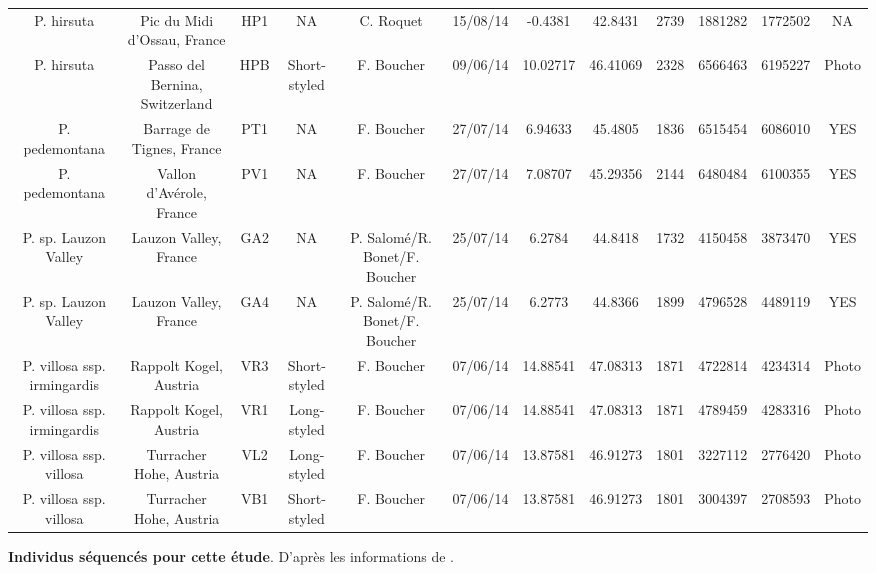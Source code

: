 \documentclass[12pt,a4paper,notitlepage,colorinlistoftodos]{article}
\begin{document}
\begin{landscape}
\begin{annexe}
{\begin{tabular}{cccccccccccc}
P. hirsuta &Pic du Midi d'Ossau, France &HP1 & NA &C. Roquet &15/08/14 & -0.4381 & 42.8431 &2739&1881282&1772502& NA \\
P. hirsuta &Passo del Bernina, Switzerland &HPB &Short-styled &F. Boucher &09/06/14 & 10.02717 & 46.41069 &2328&6566463&6195227&Photo \\
P. pedemontana &Barrage de Tignes, France &PT1 & NA &F. Boucher &27/07/14 & 6.94633 & 45.4805 &1836&6515454&6086010&YES \\
P. pedemontana &Vallon d'Avérole, France &PV1 & NA &F. Boucher &27/07/14 & 7.08707 & 45.29356 &2144&6480484&6100355&YES \\
P. sp. Lauzon Valley &Lauzon Valley, France &GA2 & NA &P. Salomé/R. Bonet/F. Boucher &25/07/14 & 6.2784 & 44.8418 &1732&4150458&3873470&YES \\
P. sp. Lauzon Valley &Lauzon Valley, France &GA4 & NA &P. Salomé/R. Bonet/F. Boucher &25/07/14 & 6.2773 & 44.8366 &1899&4796528&4489119&YES \\
P. villosa ssp. irmingardis &Rappolt Kogel, Austria &VR3 &Short-styled &F. Boucher &07/06/14 & 14.88541 & 47.08313 &1871&4722814&4234314&Photo \\
P. villosa ssp. irmingardis &Rappolt Kogel, Austria &VR1 &Long-styled &F. Boucher &07/06/14 & 14.88541 & 47.08313 &1871&4789459&4283316&Photo \\
P. villosa ssp. villosa &Turracher Hohe, Austria &VL2 &Long-styled &F. Boucher &07/06/14 & 13.87581 & 46.91273 &1801&3227112&2776420&Photo \\
P. villosa ssp. villosa &Turracher Hohe, Austria &VB1 &Short-styled &F. Boucher &07/06/14 & 13.87581 & 46.91273 &1801&3004397&2708593&Photo \\
	\bottomrule
	\end{tabular}}
	\caption{\textbf{Individus séquencés pour cette étude}. D'après les informations de \citet{Boucher2016a}.}
	\label{table_ind}
\end{annexe}
\end{landscape}
\end{document}
